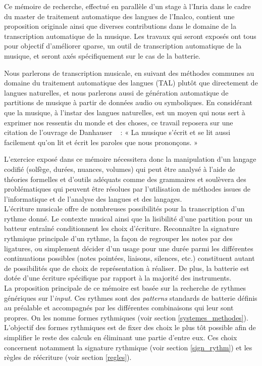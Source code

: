 Ce mémoire de recherche, effectué en parallèle d’un stage à l’Inria dans le
cadre du master de traitement automatique des langues de l’Inalco, contient
une proposition originale ainsi que diverses contributions dans le domaine de
la transcription automatique de la musique. Les travaux qui seront exposés ont
tous pour objectif d’améliorer qparse, un outil de transcription automatique de
la musique, et seront axés spécifiquement sur le cas de la batterie.

Nous parlerons de transcription musicale, en suivant des méthodes communes au
domaine du traitement automatique des langues (TAL) plutôt que directement de
langues naturelles, et nous parlerons aussi de génération automatique de
partitions de musique à partir de données audio ou symboliques. En considérant
que la musique, à l’instar des langues naturelles, est un moyen qui nous sert à
exprimer nos ressentis du monde et des choses, ce travail reposera sur une
citation de l’ouvrage de Danhauser \cite{danhauser}~ : « La musique s’écrit et
se lit aussi facilement qu’on lit et écrit les paroles que nous prononçons. »

L’exercice exposé dans ce mémoire nécessitera donc la manipulation d’un langage
codifié (solfège, durées, nuances, volumes) qui peut être analysé à l’aide de
théories formelles et d’outils adéquats comme des grammaires  et soulèvera des
problématiques qui peuvent être résolues par l’utilisation de méthodes issues
de l’informatique et de l’analyse des langues et des langages.\\

L’écriture musicale offre de nombreuses possibilités pour la transcription d’un
rythme donné. Le contexte musical ainsi que la lisibilité d’une partition pour
un batteur entraîné conditionnent les choix d’écriture. Reconnaître la
signature rythmique principale d’un rythme, la façon de regrouper les notes par
des ligatures, ou simplement décider d’un usage pour une durée parmi les
différentes continuations possibles (notes pointées, liaisons, silences, etc.)
constituent autant de possibilités que de choix de représentation à réaliser.
De plus, la batterie est dotée d’une écriture spécifique par rapport à la
majorité des instruments.\\

La proposition principale de ce mémoire est basée sur la recherche de rythmes
génériques sur l’\textit{input}. Ces rythmes sont des \textit{patterns}
standards de batterie définis au préalable et accompagnés par les différentes
combinaisons qui leur sont propres. On les nomme formes rythmiques (voir
section \ref{systemes_methodes}). L’objectif des formes rythmiques est de fixer
des choix le plus tôt possible afin de simplifier le reste des calculs en
éliminant une partie d’entre eux. Ces choix concernent notamment la signature
rythmique (voir section \ref{sign_rythm}) et les règles de réécriture (voir
section \ref{regles}).\\

